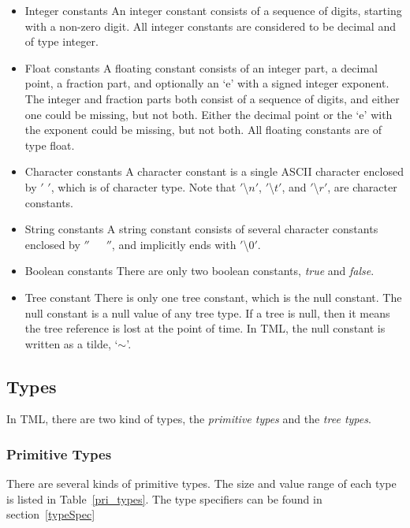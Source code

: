 \documentclass[12pt,psfig,a4]{article}
\begin{document}
\begin{itemize}
\item Integer constants
An integer constant consists of a sequence of digits, starting with a non-zero digit. All integer constants are considered to be decimal and of type integer.

\item Float constants
A floating constant consists of an integer part, a decimal point, a fraction part, and optionally an `e' with a signed integer exponent. The integer and fraction parts both consist of a sequence of digits, and either one could be missing, but not both. Either the decimal point or the `e' with the exponent could be missing, but not both. All floating constants are of type float.

\item Character constants
A character constant is a single ASCII character enclosed by $'$ $'$, which is of character type. Note that $'$\textbackslash$n'$, $'$\textbackslash$t'$, and $'$\textbackslash$r'$, are character constants.

\item String constants
A string constant consists of several character constants enclosed by $''$~~~$''$, and implicitly ends with $'$\textbackslash$0'$.

\item Boolean constants
There are only two boolean constants, \textit{true} and \textit{false}.

\item Tree constant
There is only one tree constant, which is the null constant. The null constant is a null value of any tree type. If a tree is null, then it means the tree reference is lost at the point of time. In TML, the null constant is written as a tilde, `$\sim$'.

\end{itemize}

\subsection {Types}
In TML, there are two kind of types, the \textit{primitive types} and the \textit{tree types}.

\subsubsection {Primitive Types}
There are several kinds of primitive types. The size and value range of each type is listed in Table~\ref{pri_types}. The type specifiers can be found in section~\ref{typeSpec}
\end{document}
